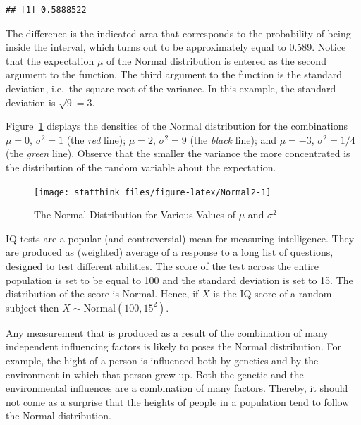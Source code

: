 \documentclass[
]{krantz}
\theoremstyle{definition}
\theoremstyle{definition}
\theoremstyle{definition}
\theoremstyle{remark}
\let\BeginKnitrBlock\begin \let\EndKnitrBlock\end
\begin{document}
\begin{verbatim}
## [1] 0.5888522
\end{verbatim}

The difference is the indicated area that corresponds to the probability
of being inside the interval, which turns out to be approximately equal
to 0.589. Notice that the expectation \(\mu\) of the Normal distribution
is entered as the second argument to the function. The third argument to
the function is the standard deviation, i.e.~the square root of the
variance. In this example, the standard deviation is \(\sqrt{9}=3\).

Figure~\ref{fig:Normal2} displays the densities of the Normal
distribution for the combinations \(\mu= 0\), \(\sigma^2 = 1\) (the \emph{red}
line); \(\mu = 2\), \(\sigma^2 = 9\) (the \emph{black} line); and \(\mu = -3\),
\(\sigma^2 = 1/4\) (the \emph{green} line). Observe that the smaller the
variance the more concentrated is the distribution of the random
variable about the expectation.

\begin{figure}

{\centering \texttt{[image: statthink\_files/figure-latex/Normal2-1]} 

}

\caption{The Normal Distribution for Various Values of $\mu$ and $\sigma^2$}\label{fig:Normal2}
\end{figure}

\BeginKnitrBlock{example}
\protect\hypertarget{exm:exnormal1}{}{\label{exm:exnormal1} }IQ tests are a popular (and controversial) mean for
measuring intelligence. They are produced as (weighted) average of a
response to a long list of questions, designed to test different
abilities. The score of the test across the entire population is set to
be equal to 100 and the standard deviation is set to 15. The
distribution of the score is Normal. Hence, if \(X\) is the IQ score of a
random subject then \(X \sim \mathrm{Normal}(100,15^2)\).
\EndKnitrBlock{example}

\BeginKnitrBlock{example}
\protect\hypertarget{exm:exnormal2}{}{\label{exm:exnormal2} }Any measurement that is produced as a result of the
combination of many independent influencing factors is likely to poses
the Normal distribution. For example, the hight of a person is
influenced both by genetics and by the environment in which that person
grew up. Both the genetic and the environmental influences are a
combination of many factors. Thereby, it should not come as a surprise
that the heights of people in a population tend to follow the Normal
distribution.
\EndKnitrBlock{example}
\end{document}
